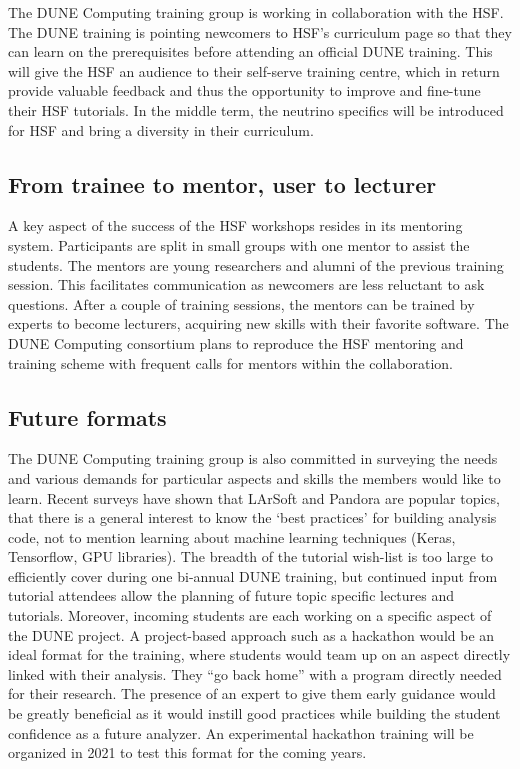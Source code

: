 \documentclass[../main-v1.tex]{subfiles}
\begin{document}
The DUNE Computing training group is working in collaboration with the HSF. The DUNE training is pointing newcomers to HSF's curriculum page so that they can learn on the prerequisites before attending an official DUNE training. This will give the HSF an audience to their self-serve training centre, which in return provide valuable feedback and thus the opportunity to improve and fine-tune their HSF tutorials. In the middle term, the neutrino specifics will be introduced for HSF and bring a diversity in their curriculum.

\subsection{From trainee to mentor, user to lecturer}
A key aspect of the success of the HSF workshops resides in its mentoring system. Participants are split in small groups with one mentor to assist the students. The mentors are young researchers and alumni of the previous training session. This facilitates communication as newcomers are less reluctant to ask questions. After a couple of training sessions, the mentors can be trained by experts to become lecturers, acquiring new skills with their favorite software. The DUNE Computing consortium plans to reproduce the HSF mentoring and training scheme with frequent calls for mentors within the collaboration.

\subsection{Future formats}
The DUNE Computing training group is also committed in surveying the needs and various demands for particular aspects and skills the members would like to learn. Recent surveys have shown that LArSoft and Pandora are popular topics, that there is a general interest to know the ‘best practices’ for building analysis code, not to mention learning about machine learning techniques (Keras, Tensorflow, GPU libraries). The breadth of the tutorial wish-list is too large to efficiently cover during one bi-annual DUNE training, but continued input from tutorial attendees allow the planning of future topic specific lectures and tutorials. Moreover, incoming students are each working on a specific aspect of the DUNE project. A project-based approach such as a hackathon would be an ideal format for the training, where students would team up on an aspect directly linked with their analysis. They “go back home” with a program directly needed for their research. The presence of an expert to give them early guidance would be greatly beneficial as it would instill good practices while building the student confidence as a future analyzer. An experimental hackathon training will be organized in 2021 to test this format for the coming years.
\end{document}

